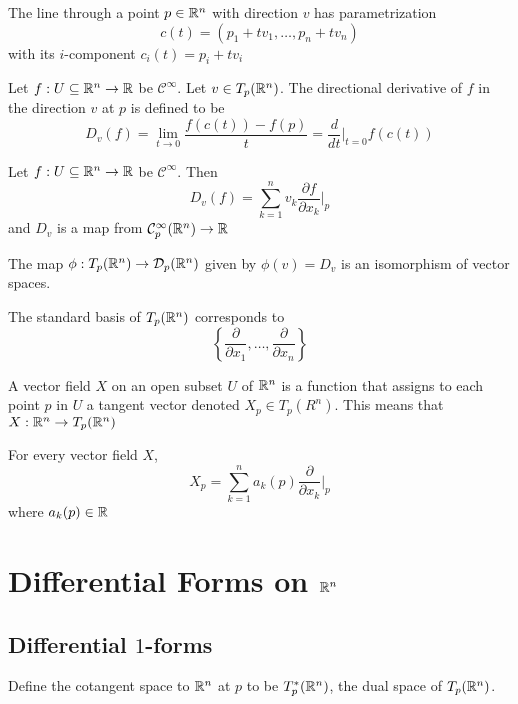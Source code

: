 \documentclass[a4paper]{article}
\begin{document}
\begin{defn} The line through a point $p\in\mathbb{R}^n$ with direction $v$ has parametrization $$c(t)=(p_1+tv_1,\dots,p_n+tv_n)$$ with its $i$-component $c_i(t)=p_i+tv_i$
\end{defn}

\begin{defn} Let $f:U\subseteq\mathbb{R}^n\to\mathbb{R}$ be $\mathcal{C}^\infty$. Let $v\in T_p(\mathbb{R}^n)$. The directional derivative of $f$ in the direction $v$ at $p$ is defined to be $$D_v(f)=\lim_{t\to 0}\frac{f(c(t))-f(p)}{t}=\frac{d}{dt}\bigg\vert_{t=0}f(c(t))$$
\end{defn}

\begin{prp} Let $f:U\subseteq\mathbb{R}^n\to\mathbb{R}$ be $\mathcal{C}^\infty$. Then $$D_v(f)=\sum_{k=1}^nv_k\frac{\partial f}{\partial x_k}\bigg\vert_p$$ and $D_v$ is a map from $\mathcal{C}_p^\infty(\mathbb{R}^n)\to\mathbb{R}$
\end{prp}

\begin{prp} The map $\phi:T_p(\mathbb{R}^n)\to\mathcal{D}_p(\mathbb{R}^n)$ given by $\phi(v)=D_v$ is an isomorphism of vector spaces. 
\end{prp}

\begin{prp} The standard basis of $T_p(\mathbb{R}^n)$ corresponds to $$\left\{\frac{\partial}{\partial x_1},\dots,\frac{\partial}{\partial x_n}\right\}$$
\end{prp}

\begin{defn} A vector field $X$ on an open subset $U$ of $\mathbb{R}^n$ is a function that assigns to each point $p$ in $U$ a tangent vector denoted $X_p\in T_p(R^n)$. This means that $X:\mathbb{R}^n\to T_p(\mathbb{R}^n)$
\end{defn}

\begin{prp} For every vector field $X$, $$X_p=\sum_{k=1}^na_k(p)\frac{\partial}{\partial x_k}\bigg\vert_p$$ where $a_k(p)\in\mathbb{R}$
\end{prp}

\pagebreak
\section{Differential Forms on $\mathbb{R}^n$}
\subsection{Differential $1$-forms}
\begin{defn} Define the cotangent space to $\mathbb{R}^n$ at $p$ to be $T_p^\ast(\mathbb{R}^n)$, the dual space of $T_p(\mathbb{R}^n)$. 
\end{defn}
\end{document}
